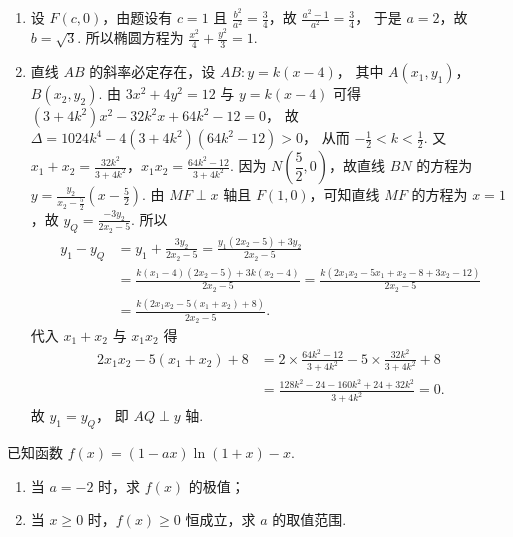 \begin{solution}
\begin{enumerate}
\item 设 \( F(c,0) \)，由题设有 \( c=1 \) 且 \( \frac{b^2}{a^2}=\frac{3}{4} \)，故
\(
\frac{a^2-1}{a^2}=\frac{3}{4}
\)，
于是 \( a=2 \)，故 \( b=\sqrt{3} \).
所以椭圆方程为
\(\frac{x^2}{4}+\frac{y^2}{3}=1\).

\item 直线 \(AB\) 的斜率必定存在，设
\(AB:y=k(x-4)\)，
其中 \( A(x_1,y_1) \)，\( B(x_2,y_2) \).
由 \( 3x^2+4y^2=12 \) 与 \( y=k(x-4) \) 可得
\(
\left( 3+4k^2 \right)x^2-32k^2x+64k^2-12=0
\)，
故
\(
\Delta=1024k^4-4\left( 3+4k^2 \right)\left( 64k^2-12 \right)>0
\)，
从而 \( -\frac{1}{2}<k<\frac{1}{2} \).
又
\(x_1+x_2=\frac{32k^2}{3+4k^2}\)，\(x_1x_2=\frac{64k^2-12}{3+4k^2}\).
因为 \( N\left( \dfrac{5}{2},0 \right) \)，故直线 \(BN\) 的方程为
\(y=\frac{y_2}{x_2-\frac{5}{2}}\left( x-\frac{5}{2} \right)\).
由 \( MF\perp x \) 轴且 \( F(1,0) \)，可知直线 \(MF\) 的方程为 \( x=1 \)，故
\(y_Q=\frac{-3y_2}{2x_2-5}\).
所以
\[
\begin{aligned}
y_1-y_Q
&=y_1+\frac{3y_2}{2x_2-5}
=\frac{y_1(2x_2-5)+3y_2}{2x_2-5}\\
&=\frac{k(x_1-4)(2x_2-5)+3k(x_2-4)}{2x_2-5}
=\frac{k\left( 2x_1x_2-5x_1+x_2-8+3x_2-12 \right)}{2x_2-5}\\
&=\frac{k\left( 2x_1x_2-5(x_1+x_2)+8 \right)}{2x_2-5}.
\end{aligned}
\]
代入 \( x_1+x_2 \) 与 \( x_1x_2 \) 得
\[
\begin{aligned}
2x_1x_2-5(x_1+x_2)+8
&=2\times \frac{64k^2-12}{3+4k^2}-5\times \frac{32k^2}{3+4k^2}+8\\
&=\frac{128k^2-24-160k^2+24+32k^2}{3+4k^2}=0.
\end{aligned}
\]
故
\(y_1=y_Q\)，
即 \( AQ\perp y \) 轴.
\end{enumerate}
\end{solution}

\begin{problem}
已知函数 \( f(x)=(1-ax)\ln(1+x)-x \).

\begin{enumerate}
\item 当 \( a=-2 \) 时，求 \( f(x) \) 的极值；
\item 当 \( x\ge 0 \) 时，\( f(x)\ge 0 \) 恒成立，求 \( a \) 的取值范围.
\end{enumerate}
\end{problem}

